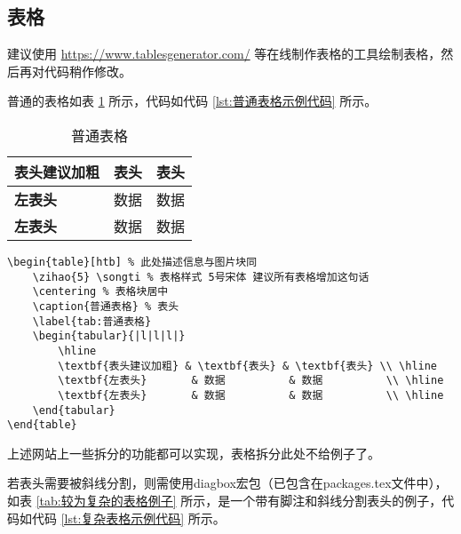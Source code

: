 \subsection{表格}

建议使用 \url{https://www.tablesgenerator.com/} 等在线制作表格的工具绘制表格，然后再对代码稍作修改。

普通的表格如表 \ref{tab:普通表格} 所示，代码如代码 \ref{lst:普通表格示例代码} 所示。

\begin{table}[htb] %
     \songti %
    \centering %
    \caption{普通表格} %
    \label{tab:普通表格}
    \begin{tabular}{|l|l|l|}
        \hline
        \textbf{表头建议加粗} & \textbf{表头} & \textbf{表头} \\ \hline
        \textbf{左表头}       & 数据          & 数据          \\ \hline
        \textbf{左表头}       & 数据          & 数据          \\ \hline
    \end{tabular}
\end{table}

\begin{lstlisting}[caption=普通表格示例 \LaTeX 代码,label=lst:普通表格示例代码]
\begin{table}[htb] % 此处描述信息与图片块同
    \zihao{5} \songti % 表格样式 5号宋体 建议所有表格增加这句话
    \centering % 表格块居中
    \caption{普通表格} % 表头
    \label{tab:普通表格}
    \begin{tabular}{|l|l|l|}
        \hline
        \textbf{表头建议加粗} & \textbf{表头} & \textbf{表头} \\ \hline
        \textbf{左表头}       & 数据          & 数据          \\ \hline
        \textbf{左表头}       & 数据          & 数据          \\ \hline
    \end{tabular}
\end{table}
\end{lstlisting}

上述网站上一些拆分的功能都可以实现，表格拆分此处不给例子了。

若表头需要被斜线分割，则需使用diagbox宏包（已包含在packages.tex文件中），如表 \ref{tab:较为复杂的表格例子} 所示，是一个带有脚注和斜线分割表头的例子，代码如代码 \ref{lst:复杂表格示例代码} 所示。

